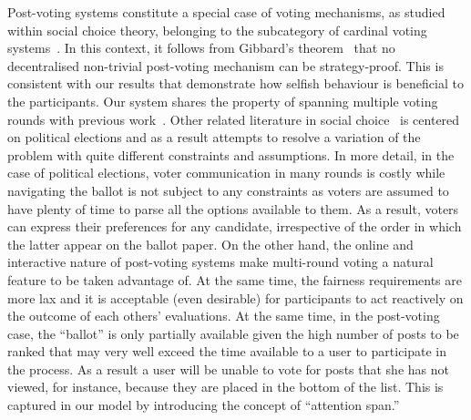 Post-voting systems constitute a special case of voting mechanisms, as studied within social choice theory, belonging to the subcategory of cardinal voting systems~\cite{hillinger2005case}. In this context, it follows from Gibbard's theorem~\cite{gibbard1973manipulation} that no decentralised non-trivial 
post-voting mechanism can be strategy-proof. This is consistent with our results that 
demonstrate how selfish behaviour is beneficial to the participants. Our system shares the property of spanning multiple voting rounds with previous work~\cite{kalech2011practical}. Other related literature in social choice~\cite{lu2011robust,conitzer2005communication,xia2010compilation} is centered on political elections and as a result attempts to resolve a variation of the problem with quite different constraints and assumptions. In more detail, in the case of political elections, voter communication in many rounds is costly while navigating the ballot  is not subject to any constraints as voters are assumed to have plenty of time to parse all the options available to them. As a result, voters can express their preferences for any candidate, irrespective of the order in which the latter appear on the ballot paper. On the other hand, the online and interactive nature of post-voting systems make multi-round voting a natural feature to be taken advantage of. At the same time, the fairness requirements are more lax and it is acceptable (even desirable) for participants to act reactively on the outcome of each others' evaluations.  At the same time, in the post-voting case, the ``ballot'' is only partially available given the high number of posts to be ranked that may very well exceed the time available to a user to participate in the process. As a result a user will be  unable to vote for posts that she has not viewed, for instance,  because they are placed in the bottom of the list. This is captured in our  model by introducing the concept of ``attention span.''

